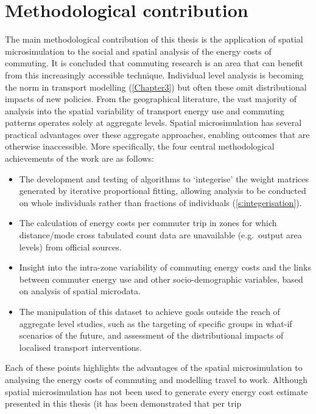 \section{Methodological contribution} \label{smethcont}
The main methodological contribution of this thesis is the application of spatial
microsimulation to the social and spatial analysis of the energy costs of commuting.
It is concluded that commuting
research is an area that can benefit from this increasingly accessible
technique. Individual level analysis is becoming the norm in
transport modelling (\cref{Chapter3}) but often these
omit distributional impacts of new policies.
From the geographical literature, the vast majority of analysis into the spatial variability
of transport energy use and commuting patterns operates solely at aggregate levels.
Spatial microsimulation has several practical advantages over these
aggregate approaches, enabling outcomes that are otherwise inaccessible.
More specifically, the four central methodological achievements of the
work are as follows:
\begin{itemize}
 \item The development and testing of algorithms to `integerise' the 
 weight matrices generated by iterative proportional fitting, allowing analysis
 to be conducted on whole individuals rather than fractions of individuals
(\cref{s:integerisation}).
 \item The calculation of energy costs per commuter trip in zones for which
distance/mode cross tabulated count data are unavailable (e.g.~output area levels)
from official sources.
 \item Insight into the intra-zone variability of commuting energy costs and
the links between commuter energy use and other socio-demographic variables,
based on analysis of spatial microdata.
\item The manipulation of this dataset to achieve goals outside the reach of
aggregate level studies, such as the targeting of specific groups in what-if
scenarios of the future, and assessment of the distributional impacts of
localised transport interventions.
\end{itemize}
Each of these points highlights the advantages of the spatial microsimulation
to analysing the energy costs of commuting and modelling travel to work.
Although spatial microsimulation has not been used to generate every energy
cost estimate presented in this thesis (it has been demonstrated that per trip
